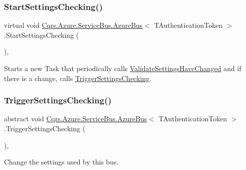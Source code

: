 \subsubsection{\texorpdfstring{Start\+Settings\+Checking()}{StartSettingsChecking()}}
{\footnotesize\ttfamily virtual void \hyperlink{classCqrs_1_1Azure_1_1ServiceBus_1_1AzureBus}{Cqrs.\+Azure.\+Service\+Bus.\+Azure\+Bus}$<$ T\+Authentication\+Token $>$.Start\+Settings\+Checking (\begin{DoxyParamCaption}{ }\end{DoxyParamCaption})\hspace{0.3cm}{\ttfamily [protected]}, {\ttfamily [virtual]}}



Starts a new Task that periodically calls \hyperlink{classCqrs_1_1Azure_1_1ServiceBus_1_1AzureBus_a9fa1f5a74819100c40d8079ac6a6adb9_a9fa1f5a74819100c40d8079ac6a6adb9}{Validate\+Settings\+Have\+Changed} and if there is a change, calls \hyperlink{classCqrs_1_1Azure_1_1ServiceBus_1_1AzureBus_ae501f84c4983bfa3b2ae4551749ac998_ae501f84c4983bfa3b2ae4551749ac998}{Trigger\+Settings\+Checking}. 

\mbox{\label{classCqrs_1_1Azure_1_1ServiceBus_1_1AzureBus_ae501f84c4983bfa3b2ae4551749ac998_ae501f84c4983bfa3b2ae4551749ac998}} 
\subsubsection{\texorpdfstring{Trigger\+Settings\+Checking()}{TriggerSettingsChecking()}}
{\footnotesize\ttfamily abstract void \hyperlink{classCqrs_1_1Azure_1_1ServiceBus_1_1AzureBus}{Cqrs.\+Azure.\+Service\+Bus.\+Azure\+Bus}$<$ T\+Authentication\+Token $>$.Trigger\+Settings\+Checking (\begin{DoxyParamCaption}{ }\end{DoxyParamCaption})\hspace{0.3cm}{\ttfamily [protected]}, {}}



Change the settings used by this bus. 



